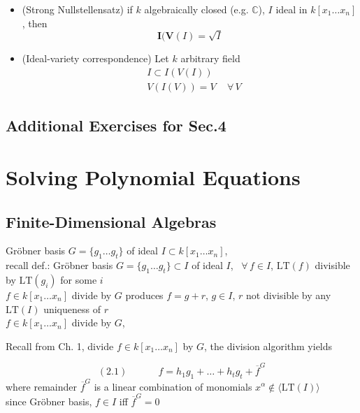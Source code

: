 \documentclass[10pt]{amsart}
\newcommand{\exercisehead}[1]
  { \smallskip
   \noindent{\small\bf Exercise #1.}
  }
\begin{document}
\begin{multicols*}{2}
\begin{itemize}
  \item (Strong Nullstellensatz) if $k$ algebraically closed (e.g. $\mathbb{C}$), $I$ ideal in $k[x_1 \dots x_n]$, then 
\[
\mathbf{I}(\mathbf{V}(I) = \sqrt{I}
\]
\item (Ideal-variety correspondence) Let $k$ arbitrary field
\[
\begin{aligned}
  & I \subset I(V(I)) \\ 
  & V(I(V)) = V \quad \, \forall \, V
\end{aligned}
\]
\end{itemize}

\subsection*{Additional Exercises for Sec.4}

\exercisehead{6}



\section{ Solving Polynomial Equations}

\subsection{}

\subsection{Finite-Dimensional Algebras}

Gr\"obner basis $G = \lbrace g_1 \dots g_t \rbrace$ of ideal $I\subset k[x_1\dots x_n]$, \\
recall def.: Gr\"obner basis $G = \lbrace g_1 \dots g_t\rbrace \subset I$ of ideal $I$, \, $\forall \, f \in I$, $\text{LT}(f)$ divisible by $\text{LT}(g_i)$ for some $i$ \\
\phantom{\quad \, } $f \in k[x_1\dots x_n]$ divide by $G$ produces $f=g+r$, $g\in I$, $r$ not divisible by any $\text{LT}(I)$ uniqueness of $r$ \\
$f\in k[x_1 \dots x_n]$ divide by $G$, 

Recall from Ch. 1, divide $f\in k[x_1 \dots x_n]$ by $G$, the division algorithm yields

\begin{equation}
  (2.1)  \quad \quad \quad \, f = h_1 g_1 + \dots + h_t g_t + \overline{f}^G
\end{equation}
where remainder $\overline{f}^G$ is a linear combination of monomials $x^{\alpha} \notin \langle \text{LT}(I) \rangle $ \\
\phantom{\quad } since Gr\"obner basis, $f\in I$ iff $\overline{f}^G=0$


\end{multicols*}
\end{document}
